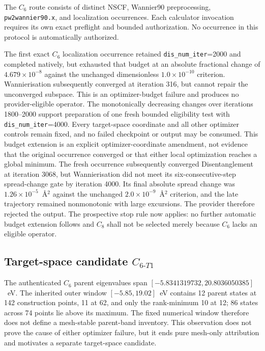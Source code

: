\documentclass[11pt]{article}
\begin{document}
The $C_6$ route consists of distinct NSCF, Wannier90 preprocessing,
\texttt{pw2wannier90.x}, and localization occurrences.  Each calculator invocation
requires its own exact preflight and bounded authorization.  No occurrence in this
protocol is automatically authorized.

The first exact $C_6$ localization occurrence retained
\texttt{dis\_num\_iter}=2000 and completed natively, but exhausted that budget at an
absolute fractional change of $4.679\times10^{-8}$ against the unchanged dimensionless
$1.0\times10^{-10}$ criterion.  Wannierisation subsequently converged at iteration 316,
but cannot repair the unconverged subspace.  This is an optimizer-budget failure and
produces no provider-eligible operator.  The monotonically decreasing changes over
iterations 1800--2000 support preparation of one fresh bounded eligibility test with
\texttt{dis\_num\_iter}=4000.  Every target-space coordinate and all other optimizer
controls remain fixed, and no failed checkpoint or output may be consumed.  This budget
extension is an explicit optimizer-coordinate amendment, not evidence that the original
occurrence converged or that either local optimization reaches a global minimum.  The
fresh occurrence subsequently converged Disentanglement at iteration 3068, but
Wannierisation did not meet its six-consecutive-step spread-change gate by iteration
4000.  Its final absolute spread change was $1.26\times10^{-5}$~\AA$^2$ against the
unchanged $2.0\times10^{-9}$~\AA$^2$ criterion, and the late trajectory remained
nonmonotonic with large excursions.  The provider therefore rejected the output.  The
prospective stop rule now applies: no further automatic budget extension follows and
$C_8$ shall not be selected merely because $C_6$ lacks an eligible operator.

\subsection{Target-space candidate \texorpdfstring{$C_{6\text{-}T1}$}{C6-T1}}

The authenticated $C_6$ parent eigenvalues span
$[-5.8341319732,20.8036050385]$~eV.  The inherited outer window
$[-5.85,19.02]$~eV contains 12 parent states at 142 construction points, 11 at 62,
and only the rank-minimum 10 at 12; 86 states across 74 points lie above its maximum.
The fixed numerical window therefore does not define a mesh-stable parent-band
inventory.  This observation does not prove the cause of either optimizer failure, but
it ends pure mesh-only attribution and motivates a separate target-space candidate.
\end{document}
